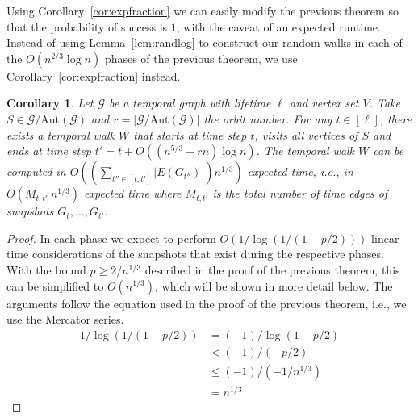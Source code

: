 \documentclass[10pt,a4paper]{article}
\newtheorem{corollary}{Corollary}[section]
\newcommand{\auttg}{\ensuremath{\text{Aut}(\mathcal{G})}}
\newcommand{\torb}{\ensuremath{\mathcal{G}/\auttg}}
\begin{document}
{{ Using Corollary~\ref{cor:expfraction} we can easily modify the
    previous theorem so that the probability of success is $1$, with the caveat
    of an expected runtime. Instead of using Lemma~\ref{lem:randlog} to
    construct our random walks in each of the $O(n^{2/3}\log n)$ phases of the
    previous theorem, we use Corollary~\ref{cor:expfraction} instead. 

\begin{corollary}\label{cor:expectedorbitexplore} 
    Let $\mathcal{G}$ be a temporal graph with lifetime $\ell$ and vertex set
    $V$. Take $S \in \torb$ and $r=|\torb|$ the orbit number. For any
    $t\in[\ell]$, there exists a temporal walk $W$ that starts at time step
    $t$, visits all vertices of $S$ and ends at time step
    $t'=t+O((n^{5/3}+rn)\log n)$. The temporal walk $W$ can be computed 
    in
    $O((\sum_{t'' \in [t, t']} |E(G_{t''})|) n^{1/3})$ expected time, {i.e.,
    in $O( M_{t,t'} \ n^{1/3})$ expected time where $M_{t,t'}$ is the total number
    of time edges of snapshots $G_t, \ldots, G_{t'}$.}
\end{corollary}
\begin{proof}
    In each phase we expect to perform $O(1/\log(1/(1-p/2)))$ linear-time
    {considerations} of the snapshots that exist during the respective phases. With the
    bound $p \geq 2/n^{1/3}$ described in the proof of the previous theorem,
    this can be simplified to $O(n^{1/3})$, which will be shown in more detail
    below. The arguments follow the equation used in the proof of the previous
    theorem, i.e., we use the Mercator series.
    \begin{align*}
        1/\log(1/(1-p/2))                     &= (-1)/\log(1-p/2)\\
                                            &< (-1)/(-p/2)\\
                                            &\leq (-1)/(-1/n^{1/3})\\
                                            &=  n^{1/3}
    \end{align*}
\end{proof}
}
}
\end{document}
